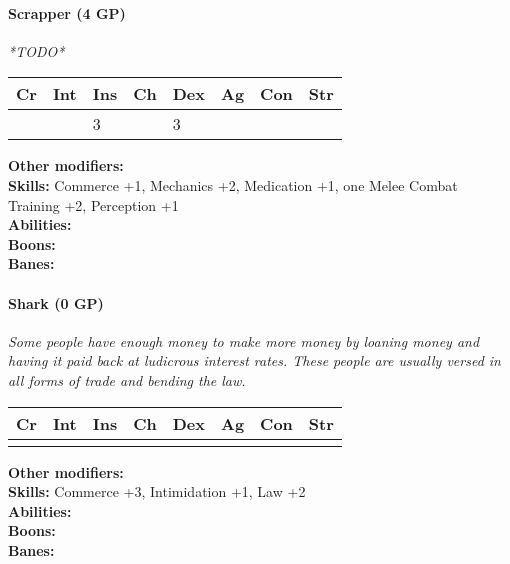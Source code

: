 \paragraph*{Scrapper (4 GP)}
\textit{*TODO*}\par
\begin{tabular}{|l|l|l|l|l|l|l|l|}
    \hline
    Cr & Int & Ins & Ch & Dex & Ag & Con & Str \\ \hline
    &  & 3 &  & 3 &  &  &  \\ \hline
\end{tabular}\par
\noindent\textbf{Other modifiers:} \\
\textbf{Skills:} Commerce +1, Mechanics +2, Medication +1, one Melee Combat Training +2, Perception +1\\
\textbf{Abilities:} \\
\textbf{Boons:} \\
\textbf{Banes:} \\

\hrulefill
\paragraph*{Shark (0 GP)}
\textit{Some people have enough money to make more money by loaning money and having it paid back at ludicrous interest rates. These people are usually versed in all forms of trade and bending the law.}\par
\begin{tabular}{|l|l|l|l|l|l|l|l|}
	\hline
	Cr & Int & Ins & Ch & Dex & Ag & Con & Str \\ \hline
	&  &  &  &  &  &  &  \\ \hline
\end{tabular}\par
\noindent\textbf{Other modifiers:} \\
\textbf{Skills:} Commerce +3,
Intimidation +1,
Law +2\\
\textbf{Abilities:} \\
\textbf{Boons:} \\
\textbf{Banes:} \\

\hrulefill
